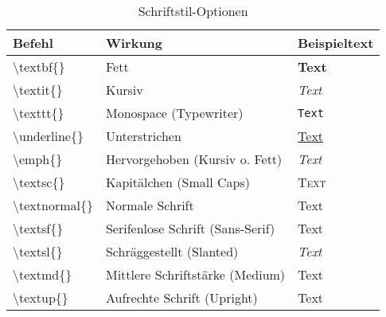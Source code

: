 \begin{table}[h]
    \centering
    \begin{tabular}{lll}
        \toprule
        \textbf{Befehl}               & \textbf{Wirkung}                 & \textbf{Beispieltext} \\
        \midrule
        \textbackslash textbf\{\}     & Fett                             & \textbf{Text}         \\
        \textbackslash textit\{\}     & Kursiv                           & \textit{Text}         \\
        \textbackslash texttt\{\}     & Monospace (Typewriter)           & \texttt{Text}         \\
        \textbackslash underline\{\}  & Unterstrichen                    & \underline{Text}      \\
        \textbackslash emph\{\}       & Hervorgehoben (Kursiv o. Fett)   & \emph{Text}           \\
        \textbackslash textsc\{\}     & Kapitälchen (Small Caps)         & \textsc{Text}         \\
        \textbackslash textnormal\{\} & Normale Schrift                  & \textnormal{Text}     \\
        \textbackslash textsf\{\}     & Serifenlose Schrift (Sans-Serif) & \textsf{Text}         \\
        \textbackslash textsl\{\}     & Schräggestellt (Slanted)         & \textsl{Text}         \\
        \textbackslash textmd\{\}     & Mittlere Schriftstärke (Medium)  & \textmd{Text}         \\
        \textbackslash textup\{\}     & Aufrechte Schrift (Upright)      & \textup{Text}         \\
        \bottomrule
    \end{tabular}
    \caption{Schriftstil-Optionen}
    \label{tab:schriftstile}
\end{table}
